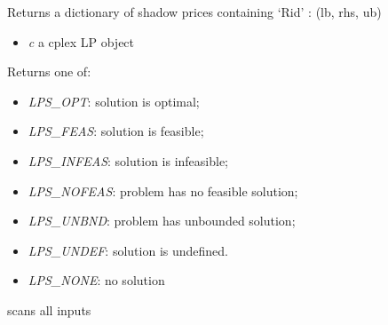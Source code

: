 \documentclass[a4paper,11pt,english]{sphinxmanual}
\begin{document}

\begin{fulllineitems}
\label{modules_doc:cbmpy.CBCPLEX.cplx_getShadowPrices}
Returns a dictionary of shadow prices containing `Rid' : (lb, rhs, ub)
\begin{itemize}
\item {} 
\emph{c} a cplex LP object

\end{itemize}

\end{fulllineitems}


\begin{fulllineitems}
\label{modules_doc:cbmpy.CBCPLEX.cplx_getSolutionStatus}
Returns one of:
\begin{itemize}
\item {} 
\emph{LPS\_OPT}: solution is optimal;

\item {} 
\emph{LPS\_FEAS}: solution is feasible;

\item {} 
\emph{LPS\_INFEAS}: solution is infeasible;

\item {} 
\emph{LPS\_NOFEAS}: problem has no feasible solution;

\item {} 
\emph{LPS\_UNBND}: problem has unbounded solution;

\item {} 
\emph{LPS\_UNDEF}: solution is undefined.

\item {} 
\emph{LPS\_NONE}: no solution

\end{itemize}

\end{fulllineitems}


\begin{fulllineitems}
\label{modules_doc:cbmpy.CBCPLEX.cplx_runInputScan}
scans all inputs

\end{fulllineitems}
\end{document}
